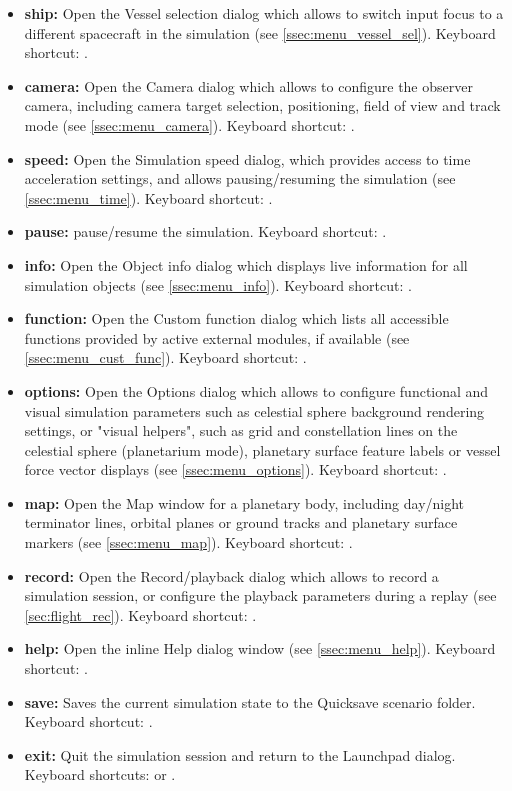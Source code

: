 \documentclass[Orbiter User Manual.tex]{subfiles}
\begin{document}
\begin{itemize}
\item \textbf{ship:} Open the Vessel selection dialog which allows to switch input focus to a different spacecraft in the simulation (see \ref{ssec:menu_vessel_sel}). Keyboard shortcut: .
\item \textbf{camera:} Open the Camera dialog which allows to configure the observer camera, including camera target selection, positioning, field of view and track mode (see \ref{ssec:menu_camera}). Keyboard shortcut: \Ctrl{}.
\item \textbf{speed:} Open the Simulation speed dialog, which provides access to time acceleration settings, and allows pausing/resuming the simulation (see \ref{ssec:menu_time}). Keyboard shortcut: \Ctrl{}.
\item \textbf{pause:} pause/resume the simulation. Keyboard shortcut: \Ctrl{}.
\item \textbf{info:} Open the Object info dialog which displays live information for all simulation objects (see \ref{ssec:menu_info}). Keyboard shortcut: \Ctrl{}.
\item \textbf{function:} Open the Custom function dialog which lists all accessible functions provided by active external modules, if available (see \ref{ssec:menu_cust_func}). Keyboard shortcut: \Ctrl{}.
\item \textbf{options:} Open the Options dialog which allows to configure functional and visual simulation parameters such as celestial sphere background rendering settings, or "visual helpers", such as grid and constellation lines on the celestial sphere (planetarium mode), planetary surface feature labels or vessel force vector displays (see \ref{ssec:menu_options}). Keyboard shortcut: \Ctrl{}.
\item \textbf{map:} Open the Map window for a planetary body, including day/night terminator lines, orbital planes or ground tracks and planetary surface markers (see \ref{ssec:menu_map}). Keyboard shortcut: \Ctrl{}.
\item \textbf{record:} Open the Record/playback dialog which allows to record a simulation session, or configure the playback parameters during a replay (see \ref{sec:flight_rec}). Keyboard shortcut: \Ctrl{}.
\item \textbf{help:} Open the inline Help dialog window (see \ref{ssec:menu_help}). Keyboard shortcut: \Alt{}.
\item \textbf{save:} Saves the current simulation state to the Quicksave scenario folder. Keyboard shortcut: \Ctrl{}.
\item \textbf{exit:} Quit the simulation session and return to the Launchpad dialog. Keyboard shortcuts: \Ctrl{} or \Alt{}.
\end{itemize}
\end{document}
